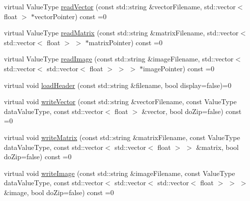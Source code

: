 \begin{DoxyCompactItemize}
\item 
virtual \-Value\-Type \hyperlink{classfileManager_aca16ebeace21a25c0f76bfc4c75595d3}{read\-Vector} (const std\-::string \&vector\-Filename, std\-::vector$<$ float $>$ $\ast$vector\-Pointer) const =0
\item 
virtual \-Value\-Type \hyperlink{classfileManager_a940f90e44c4e483659f4527e6ffa9e95}{read\-Matrix} (const std\-::string \&matrix\-Filename, std\-::vector$<$ std\-::vector$<$ float $>$ $>$ $\ast$matrix\-Pointer) const =0
\item 
virtual \-Value\-Type \hyperlink{classfileManager_a256980984836386e38f1fb3b5557a7f2}{read\-Image} (const std\-::string \&image\-Filename, std\-::vector$<$ std\-::vector$<$ std\-::vector$<$ float $>$ $>$ $>$ $\ast$image\-Pointer) const =0
\item 
virtual void \hyperlink{classfileManager_ad32c0c3e00f03a9338f1404b1e123e19}{load\-Header} (const std\-::string \&filename, bool display=false)=0
\item 
virtual void \hyperlink{classfileManager_a510ef89d143c23e69c4b7c4a56325a1d}{write\-Vector} (const std\-::string \&vector\-Filename, const \-Value\-Type data\-Value\-Type, const std\-::vector$<$ float $>$ \&vector, bool do\-Zip=false) const =0
\item 
virtual void \hyperlink{classfileManager_a60181a9ff9cf6f6d228b209d9050b21e}{write\-Matrix} (const std\-::string \&matrix\-Filename, const \-Value\-Type data\-Value\-Type, const std\-::vector$<$ std\-::vector$<$ float $>$ $>$ \&matrix, bool do\-Zip=false) const =0
\item 
virtual void \hyperlink{classfileManager_ae987e2c6a109c8bfd494f98b192969a0}{write\-Image} (const std\-::string \&image\-Filename, const \-Value\-Type data\-Value\-Type, const std\-::vector$<$ std\-::vector$<$ std\-::vector$<$ float $>$ $>$ $>$ \&image, bool do\-Zip=false) const =0
\end{DoxyCompactItemize}

